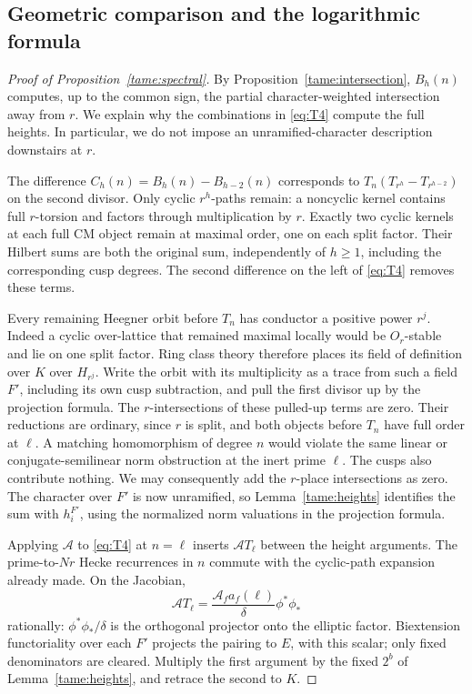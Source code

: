 \subsection{Geometric comparison and the logarithmic formula}

\begin{proof}[Proof of Proposition~\ref{tame:spectral}]
By Proposition~\ref{tame:intersection}, \(B_h(n)\) computes,
up to the common sign, the partial character-weighted
intersection away from \(r\). We explain why the combinations
in \eqref{eq:T4} compute the full heights. In particular, we
do not impose an unramified-character description downstairs
at \(r\).

The difference \(C_h(n)=B_h(n)-B_{h-2}(n)\) corresponds to
\(T_n(T_{r^h}-T_{r^{h-2}})\) on the second divisor. Only cyclic
\(r^h\)-paths remain: a noncyclic kernel contains full \(r\)-torsion
and factors through multiplication by \(r\). Exactly two cyclic
kernels at each full CM object remain at maximal order, one
on each split factor. Their Hilbert sums are both the original
sum, independently of \(h\ge1\), including the corresponding
cusp degrees. The second difference on the left of
\eqref{eq:T4} removes these terms.

Every remaining Heegner orbit before \(T_n\) has conductor
a positive power \(r^j\). Indeed a cyclic over-lattice that
remained maximal locally would be \(O_r\)-stable and lie on
one split factor. Ring class theory therefore places its field
of definition over \(K\) over \(H_{r^j}\). Write the orbit
with its multiplicity as a trace from such a field \(F'\),
including its own cusp subtraction, and pull the first divisor
up by the projection formula. The \(r\)-intersections of these
pulled-up terms are zero. Their reductions are ordinary,
since \(r\) is split, and both objects before \(T_n\) have full
order at \(\ell\). A matching homomorphism of degree \(n\)
would violate the same linear or conjugate-semilinear norm
obstruction at the inert prime \(\ell\). The cusps also
contribute nothing. We may consequently add the \(r\)-place
intersections as zero. The character over \(F'\) is now
unramified, so Lemma~\ref{tame:heights} identifies the sum with
\(h_i^{F'}\), using the normalized norm valuations in the
projection formula.

Applying \(\mathcal A\) to \eqref{eq:T4} at \(n=\ell\) inserts
\(\mathcal A T_\ell\) between the height arguments. The
prime-to-\(Nr\) Hecke recurrences in \(n\) commute with the
cyclic-path expansion already made. On the Jacobian,
\[
 \mathcal A T_\ell
     =\frac{\mathcal A_fa_f(\ell)}{\delta}\phi^*\phi_*
\]
rationally: \(\phi^*\phi_*/\delta\) is the orthogonal projector
onto the elliptic factor. Biextension functoriality over each
\(F'\) projects the pairing to \(E\), with this scalar;
only fixed denominators are cleared. Multiply the first
argument by the fixed \(2^b\) of Lemma~\ref{tame:heights},
and retrace the second to \(K\).


\end{proof}
